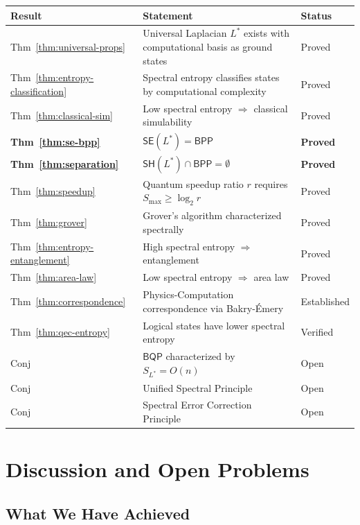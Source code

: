 \documentclass[11pt,a4paper]{article}
\theoremstyle{plain}
\theoremstyle{definition}
\theoremstyle{remark}
\newcommand{\BPP}{\mathsf{BPP}}
\newcommand{\BQP}{\mathsf{BQP}}
\newcommand{\SE}{\mathsf{SE}}
\newcommand{\SH}{\mathsf{SH}}
\begin{document}
\begin{center}
\begin{tabular}{lll}
\toprule
\textbf{Result} & \textbf{Statement} & \textbf{Status} \\
\midrule
Thm~\ref{thm:universal-props} & Universal Laplacian $L^*$ exists with computational basis as ground states & Proved \\
Thm~\ref{thm:entropy-classification} & Spectral entropy classifies states by computational complexity & Proved \\
Thm~\ref{thm:classical-sim} & Low spectral entropy $\Rightarrow$ classical simulability & Proved \\
\textbf{Thm~\ref{thm:se-bpp}} & $\SE(L^*) = \BPP$ & \textbf{Proved} \\
\textbf{Thm~\ref{thm:separation}} & $\SH(L^*) \cap \BPP = \emptyset$ & \textbf{Proved} \\
Thm~\ref{thm:speedup} & Quantum speedup ratio $r$ requires $S_{\max} \geq \log_2 r$ & Proved \\
Thm~\ref{thm:grover} & Grover's algorithm characterized spectrally & Proved \\
Thm~\ref{thm:entropy-entanglement} & High spectral entropy $\Rightarrow$ entanglement & Proved \\
Thm~\ref{thm:area-law} & Low spectral entropy $\Rightarrow$ area law & Proved \\
Thm~\ref{thm:correspondence} & Physics-Computation correspondence via Bakry-\'Emery & Established \\
Thm~\ref{thm:qec-entropy} & Logical states have lower spectral entropy & Verified \\
\midrule
Conj & $\BQP$ characterized by $S_{L^*} = O(n)$ & Open \\
Conj & Unified Spectral Principle & Open \\
Conj & Spectral Error Correction Principle & Open \\
\bottomrule
\end{tabular}
\end{center}

\section{Discussion and Open Problems}

\subsection{What We Have Achieved}
\end{document}
